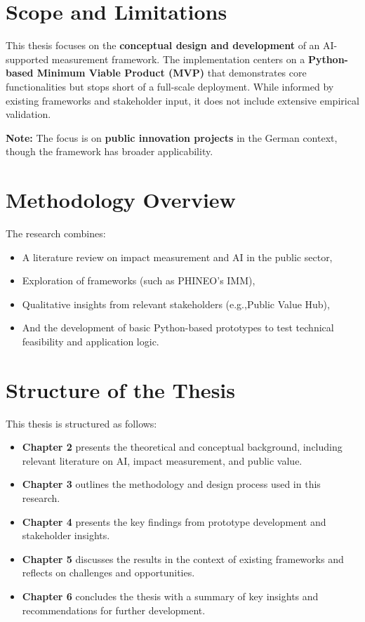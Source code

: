 \section{Scope and Limitations}\label{sec:scope-and-limitations}

This thesis focuses on the \textbf{conceptual design and development} of an AI-supported measurement framework.
The implementation centers on a \textbf{Python-based Minimum Viable Product (MVP)} that demonstrates core functionalities but stops short of a full-scale deployment.
While informed by existing frameworks and stakeholder input, it does not include extensive empirical validation.

\medskip
\noindent\textbf{Note:} The focus is on \textbf{public innovation projects} in the German context, though the framework has broader applicability.
\medskip

\section{Methodology Overview}\label{sec:methodology-overview}

The research combines:
\begin{itemize}
\item
A literature review on impact measurement and AI in the public sector,
\item
Exploration of frameworks (such as PHINEO’s IMM),
\item
Qualitative insights from relevant stakeholders (e.g.,Public Value Hub),
\item
And the development of basic Python-based prototypes to test technical feasibility and application logic.
\end{itemize}

\section{Structure of the Thesis}\label{sec:structure-of-the-thesis}

This thesis is structured as follows:

\begin{itemize}
\item
\textbf{Chapter 2} presents the theoretical and conceptual background, including relevant literature on AI, impact measurement, and public value.
\item
\textbf{Chapter 3} outlines the methodology and design process used in this research.
\item
\textbf{Chapter 4} presents the key findings from prototype development and stakeholder insights.
\item
\textbf{Chapter 5} discusses the results in the context of existing frameworks and reflects on challenges and opportunities.
\item
\textbf{Chapter 6} concludes the thesis with a summary of key insights and recommendations for further development.
\end{itemize}